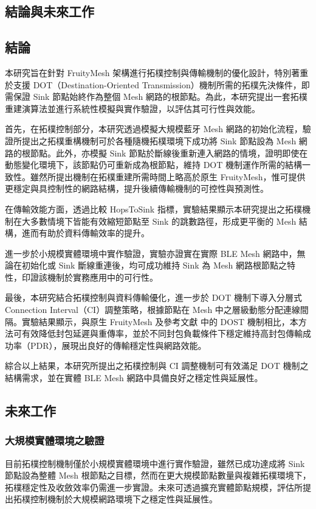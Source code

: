 \begin{ZhChapter}

\chapter{結論與未來工作}

\section{結論}
本研究旨在針對 FruityMesh 架構進行拓樸控制與傳輸機制的優化設計，特別著重於支援 DOT（Destination-Oriented Transmission）機制所需的拓樸先決條件，即需保證 Sink 節點始終作為整個 Mesh 網路的根節點。為此，本研究提出一套拓樸重建演算法並進行系統性模擬與實作驗證，以評估其可行性與效能。

首先，在拓樸控制部分，本研究透過模擬大規模藍牙 Mesh 網路的初始化流程，驗證所提出之拓樸重構機制可於各種隨機拓樸環境下成功將 Sink 節點設為 Mesh 網路的根節點。此外，亦模擬 Sink 節點於斷線後重新連入網路的情境，證明即使在動態變化環境下，該節點仍可重新成為根節點，維持 DOT 機制運作所需的結構一致性。雖然所提出機制在拓樸重建所需時間上略高於原生 FruityMesh，惟可提供更穩定與具控制性的網路結構，提升後續傳輸機制的可控性與預測性。

在傳輸效能方面，透過比較 HopsToSink 指標，實驗結果顯示本研究提出之拓樸機制在大多數情境下皆能有效縮短節點至 Sink 的跳數路徑，形成更平衡的 Mesh 結構，進而有助於資料傳輸效率的提升。

進一步於小規模實體環境中實作驗證，實驗亦證實在實際 BLE Mesh 網路中，無論在初始化或 Sink 斷線重連後，均可成功維持 Sink 為 Mesh 網路根節點之特性，印證該機制於實務應用中的可行性。

最後，本研究結合拓樸控制與資料傳輸優化，進一步於 DOT 機制下導入分層式 Connection Interval（CI）調整策略，根據節點在 Mesh 中之層級動態分配連線間隔。實驗結果顯示，與原生 FruityMesh 及參考文獻 \cite{112TIT00392032} 中的 DOST 機制相比，本方法可有效降低封包延遲與重傳率，並於不同封包負載條件下穩定維持高封包傳輸成功率（PDR），展現出良好的傳輸穩定性與網路效能。

綜合以上結果，本研究所提出之拓樸控制與 CI 調整機制可有效滿足 DOT 機制之結構需求，並在實體 BLE Mesh 網路中具備良好之穩定性與延展性。

\section{未來工作}
\subsection{大規模實體環境之驗證}
目前拓樸控制機制僅於小規模實體環境中進行實作驗證，雖然已成功達成將 Sink 節點設為整體 Mesh 根節點之目標，然而在更大規模節點數量與複雜拓樸環境下，拓樸穩定性及收斂效率仍需進一步實證。未來可透過擴充實體節點規模，評估所提出拓樸控制機制於大規模網路環境下之穩定性與延展性。


\end{ZhChapter}
